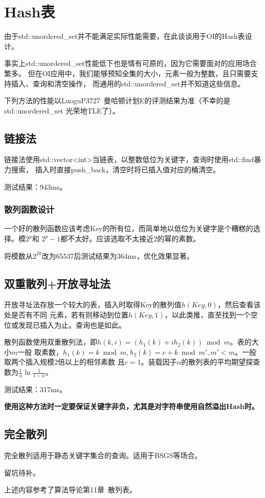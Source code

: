 \section{Hash表}\label{HashTable}
由于std::unordered\_set并不能满足实际性能需要，在此谈谈用于OI的Hash表设计。

事实上std::unordered\_set性能低下也是情有可原的，因为它需要面对的应用场合繁多。
但在OI应用中，我们能够预知全集的大小，元素一般为整数，且只需要支持插入、查询和清空操作，
而通用的std::unordered\_set并不知道这些信息。

下列方法的性能以LuoguP3727~曼哈顿计划E的评测结果为准（不幸的是\\std::unordered\_set
光荣地TLE了）。

\subsection{链接法}
链接法使用std::vector<int>当链表，以整数低位为关键字，查询时使用std::find暴力搜索，
插入时直接push\_back，清空时将已插入值对应的桶清空。

测试结果：943ms。
\subsubsection{散列函数设计}
一个好的散列函数应该考虑Key的所有位，而简单地以低位为关键字是个糟糕的选择。模$2^p$和
$2^p-1$都不太好。应该选取不太接近2的幂的素数。

将模数从$2^{20}$改为$65537$后测试结果为364ms，优化效果显著。
\subsection{双重散列+开放寻址法}
开放寻址法存放一个较大的表，插入时取得Key的散列值$h(Key,0)$，然后查看该处是否有不同
元素，若有则移动到位置$h(Key,1)$，以此类推，直至找到一个空位或发现已插入为止。查询也是如此。

散列函数使用双重散列法，即$h(k,i)=(h_1(k)+ih_2(k))\bmod m$。表的大小$m$一般
取素数，$h_1(k)=k\bmod m,h_2(k)=c+k \bmod m',m'<m$。一般取两个插入规模2倍以上的相邻素数
且$c=1$。装载因子$\alpha$的散列表的平均期望探查数为$\frac{1}{\alpha}\ln \frac{1}{1-\alpha}$。

测试结果：317ms。


{\bfseries 使用这种方法时一定要保证关键字非负，尤其是对字符串使用自然溢出Hash时。}
\subsection{完全散列}
完全散列适用于静态关键字集合的查询。适用于BSGS等场合。

留坑待补。

上述内容参考了算法导论\cite{ITA3}第11章~散列表。
